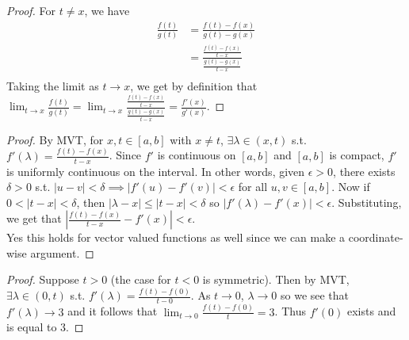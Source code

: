 \documentclass[11pt]{article}
\begin{document}
\begin{exercise}{5.7}
    \begin{proof}
        For $t \neq x$, we have \begin{equation*}
            \begin{split}
                \frac{f(t)}{g(t)} & = \frac{f(t) - f(x)}{g(t) - g(x)} \\
                & = \frac{\frac{f(t) - f(x)}{t - x}}{\frac{g(t) - g(x)}{t - x}} \\
            \end{split}
        \end{equation*}
        Taking the limit as $t \to x$, we get by definition that $\lim_{t \to x} \frac{f(t)}{g(t)} = \lim_{t \to x} \frac{\frac{f(t) - f(x)}{t - x}}{\frac{g(t) - g(x)}{t - x}} = \frac{f'(x)}{g'(x)}$. 
    \end{proof}
\end{exercise}

\begin{exercise}{5.8}
    \begin{proof}
        By MVT, for $x, t \in [a, b]$ with $x \neq t$, $\exists \lambda \in (x, t)$ s.t. $f'(\lambda) = \frac{f(t) - f(x)}{t - x}$. Since $f'$ is continuous on $[a, b]$ and $[a, b]$ is compact, $f'$ is uniformly continuous on the interval. In other words, given $\epsilon > 0$, there exists $\delta > 0$ s.t. $|u - v| < \delta \implies | f'(u) - f'(v)| < \epsilon$ for all $u, v \in [a , b]$. Now if $0 < |t - x | < \delta$, then $|\lambda - x| \le |t - x| < \delta$ so $|f'(\lambda) - f'(x)| < \epsilon$. Substituting, we get that $\left| \frac{f(t) - f(x)}{t - x} - f'(x) \right| < \epsilon$. \\

        Yes this holds for vector valued functions as well since we can make a coordinate-wise argument. 
    \end{proof}
\end{exercise}

\begin{exercise}{5.9}
    \begin{proof}
        Suppose $t > 0$ (the case for $t < 0$ is symmetric). Then by MVT, $\exists \lambda \in (0, t)$ s.t. $f'(\lambda) = \frac{f(t) - f(0)}{t - 0}$. As $t \to 0$, $\lambda \to 0$ so we see that $f'(\lambda) \to 3$ and it follows that $\lim_{t \to 0} \frac{f(t) - f(0)}{t} = 3$. Thus $f'(0)$ exists and is equal to 3. 
    \end{proof}
\end{exercise}
\end{document}
